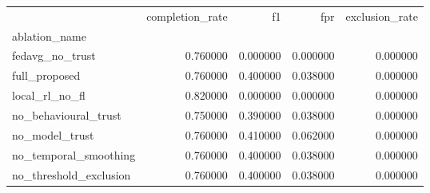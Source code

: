 \begin{tabular}{lrrrr}
\toprule
 & completion_rate & f1 & fpr & exclusion_rate \\
ablation_name &  &  &  &  \\
\midrule
fedavg_no_trust & 0.760000 & 0.000000 & 0.000000 & 0.000000 \\
full_proposed & 0.760000 & 0.400000 & 0.038000 & 0.000000 \\
local_rl_no_fl & 0.820000 & 0.000000 & 0.000000 & 0.000000 \\
no_behavioural_trust & 0.750000 & 0.390000 & 0.038000 & 0.000000 \\
no_model_trust & 0.760000 & 0.410000 & 0.062000 & 0.000000 \\
no_temporal_smoothing & 0.760000 & 0.400000 & 0.038000 & 0.000000 \\
no_threshold_exclusion & 0.760000 & 0.400000 & 0.038000 & 0.000000 \\
\bottomrule
\end{tabular}

